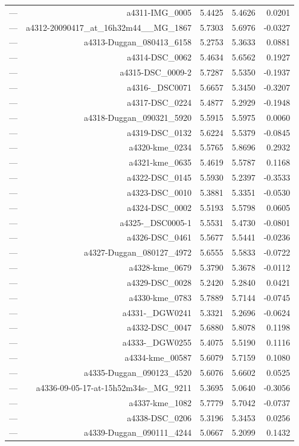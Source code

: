 \begin{table}[htbp]
\begin{tabular}{lrrrr}
— & a4311-IMG_0005 & 5.4425 & 5.4626 & 0.0201 \\
— & a4312-20090417_at_16h32m44__MG_1867 & 5.7303 & 5.6976 & -0.0327 \\
— & a4313-Duggan_080413_6158 & 5.2753 & 5.3633 & 0.0881 \\
— & a4314-DSC_0062 & 5.4634 & 5.6562 & 0.1927 \\
— & a4315-DSC_0009-2 & 5.7287 & 5.5350 & -0.1937 \\
— & a4316-_DSC0071 & 5.6657 & 5.3450 & -0.3207 \\
— & a4317-DSC_0224 & 5.4877 & 5.2929 & -0.1948 \\
— & a4318-Duggan_090321_5920 & 5.5915 & 5.5975 & 0.0060 \\
— & a4319-DSC_0132 & 5.6224 & 5.5379 & -0.0845 \\
— & a4320-kme_0234 & 5.5765 & 5.8696 & 0.2932 \\
— & a4321-kme_0635 & 5.4619 & 5.5787 & 0.1168 \\
— & a4322-DSC_0145 & 5.5930 & 5.2397 & -0.3533 \\
— & a4323-DSC_0010 & 5.3881 & 5.3351 & -0.0530 \\
— & a4324-DSC_0002 & 5.5193 & 5.5798 & 0.0605 \\
— & a4325-_DSC0005-1 & 5.5531 & 5.4730 & -0.0801 \\
— & a4326-DSC_0461 & 5.5677 & 5.5441 & -0.0236 \\
— & a4327-Duggan_080127_4972 & 5.6555 & 5.5833 & -0.0722 \\
— & a4328-kme_0679 & 5.3790 & 5.3678 & -0.0112 \\
— & a4329-DSC_0028 & 5.2420 & 5.2840 & 0.0421 \\
— & a4330-kme_0783 & 5.7889 & 5.7144 & -0.0745 \\
— & a4331-_DGW0241 & 5.3321 & 5.2696 & -0.0624 \\
— & a4332-DSC_0047 & 5.6880 & 5.8078 & 0.1198 \\
— & a4333-_DGW0255 & 5.4075 & 5.5190 & 0.1116 \\
— & a4334-kme_00587 & 5.6079 & 5.7159 & 0.1080 \\
— & a4335-Duggan_090123_4520 & 5.6076 & 5.6602 & 0.0525 \\
— & a4336-09-05-17-at-15h52m34s-_MG_9211 & 5.3695 & 5.0640 & -0.3056 \\
— & a4337-kme_1082 & 5.7779 & 5.7042 & -0.0737 \\
— & a4338-DSC_0206 & 5.3196 & 5.3453 & 0.0256 \\
— & a4339-Duggan_090111_4244 & 5.0667 & 5.2099 & 0.1432 \\

\end{tabular}
\end{table}
